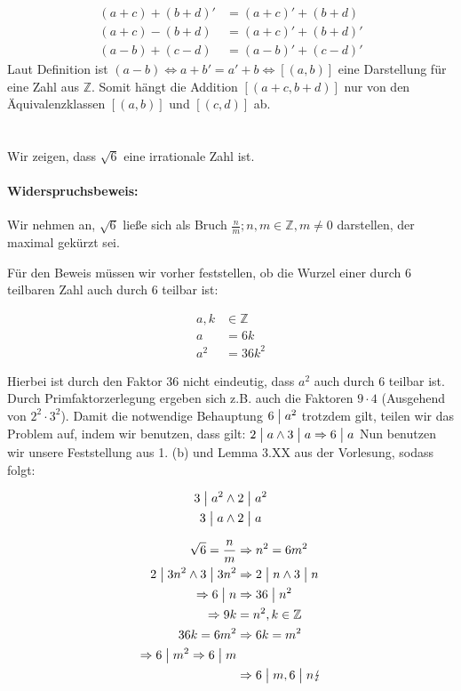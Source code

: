 \documentclass[11pt,a4paper]{article}
\begin{document}
\begin{align*}
(a+c)+(b+d)' &= (a+c)' + (b+d)\\
(a+c)-(b+d) &= (a+c)' + (b+d)'\\
(a-b)+(c-d) &= (a-b)' + (c-d)'
\end{align*}
Laut Definition ist $(a-b) \Leftrightarrow a+b' = a'+b \Leftrightarrow [(a,b)]$ eine Darstellung für eine Zahl aus $\mathbb{Z}$. Somit hängt die Addition $[(a+c,b+d)]$ nur von den Äquivalenzklassen $[(a,b)]$ und $[(c,d)]$ ab.

\newpage
\section{} %
Wir zeigen, dass $\sqrt{6}$ eine irrationale Zahl ist.

\paragraph{Widerspruchsbeweis:}
Wir nehmen an, $\sqrt{6}$ ließe sich als Bruch $\frac{n}{m}; n, m \in \mathbb{Z}, m \neq 0$ darstellen, der maximal gekürzt sei.

\noindent Für den Beweis müssen wir vorher feststellen, ob die Wurzel einer durch $6$ teilbaren Zahl auch durch $6$ teilbar ist:

\begin{align*}
a, k &\in \mathbb{Z}\\
a &= 6k\\
a^2 &= 36k^2
\end{align*}

Hierbei ist durch den Faktor $36$ nicht eindeutig, dass $a^2$ auch durch $6$ teilbar ist. Durch Primfaktorzerlegung ergeben sich z.B. auch die Faktoren $9 \cdot 4$ (Ausgehend von $2^2 \cdot 3^2$). Damit die notwendige Behauptung $6 \bigm| a^2$ trotzdem gilt, teilen wir das Problem auf, indem wir benutzen, dass gilt: $2 \bigm| a \wedge 3 \bigm| a \Rightarrow 6 \bigm| a$
Nun benutzen wir unsere Feststellung aus 1. (b) und Lemma 3.XX aus der Vorlesung, sodass folgt:

\begin{align*}
3 \bigm| a^2 &\wedge 2 \bigm| a^2\\
3 \bigm| a &\wedge 2 \bigm| a
\end{align*}

\begin{align*}
\sqrt{6} = \frac{n}{m} &\Rightarrow n^2 = 6m^2\\
2 \bigm| 3n^2 \wedge 3 \bigm| 3n^2 &\Rightarrow 2 \bigm| n \wedge 3 \bigm| n\\
\Rightarrow 6 \bigm| n &\Rightarrow 36 \bigm| n^2\\
\Rightarrow 9k &= n^2, k \in \mathbb{Z}\\
36k = 6m^2 &\Rightarrow 6k = m^2\\
\Rightarrow 6 \bigm| m^2 \Rightarrow 6 \bigm| m\\
&\Rightarrow 6 \bigm| m, 6 \bigm| n \lightning
\end{align*}
\end{document}
